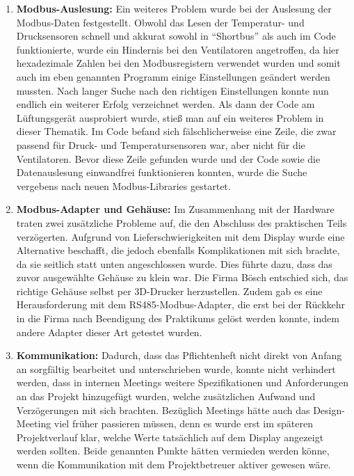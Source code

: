 \begin{enumerate}
	\item \textbf{Modbus-Auslesung:} Ein weiteres Problem wurde bei der Auslesung der Modbus-Daten festgestellt. Obwohl das Lesen der Temperatur- und Drucksensoren schnell und akkurat sowohl in \enquote{Shortbus} als auch im Code funktionierte, wurde ein Hindernis bei den Ventilatoren angetroffen, da hier hexadezimale Zahlen bei den Modbusregistern verwendet wurden und somit auch im eben genannten Programm einige Einstellungen geändert werden mussten. Nach langer Suche nach den richtigen Einstellungen konnte nun endlich ein weiterer Erfolg verzeichnet werden. Als dann der Code am Lüftungsgerät ausprobiert wurde, stieß man auf ein weiteres Problem in dieser Thematik. Im Code befand sich fälschlicherweise eine Zeile, die zwar passend für Druck- und Temperatursensoren war, aber nicht für die Ventilatoren. Bevor diese Zeile gefunden wurde und der Code sowie die Datenauslesung einwandfrei funktionieren konnten, wurde die Suche vergebens nach neuen Modbus-Libraries gestartet.
	\item \textbf{Modbus-Adapter und Gehäuse:} Im Zusammenhang mit der Hardware traten zwei zusätzliche Probleme auf, die den Abschluss des praktischen Teils verzögerten. Aufgrund von Lieferschwierigkeiten mit dem Display wurde eine Alternative beschafft, die jedoch ebenfalls Komplikationen mit sich brachte, da sie seitlich statt unten angeschlossen wurde. Dies führte dazu, dass das zuvor ausgewählte Gehäuse zu klein war. Die Firma Bösch entschied sich, das richtige Gehäuse selbst per 3D-Drucker herzustellen. Zudem gab es eine Herausforderung mit dem RS485-Modbus-Adapter, die erst bei der Rückkehr in die Firma nach Beendigung des Praktikums gelöst werden konnte, indem andere Adapter dieser Art getestet wurden.
	\item \textbf{Kommunikation:} Dadurch, dass das Pflichtenheft nicht direkt von Anfang an sorgfältig bearbeitet und unterschrieben wurde, konnte nicht verhindert werden, dass in internen Meetings weitere Spezifikationen und Anforderungen an das Projekt hinzugefügt wurden, welche zusätzlichen Aufwand und Verzögerungen mit sich brachten. Bezüglich Meetings hätte auch das Design-Meeting viel früher passieren müssen, denn es wurde erst im späteren Projektverlauf klar, welche Werte tatsächlich auf dem Display angezeigt werden sollten. Beide genannten Punkte hätten vermieden werden könne, wenn die Kommunikation mit dem Projektbetreuer aktiver gewesen wäre.
\end{enumerate}
